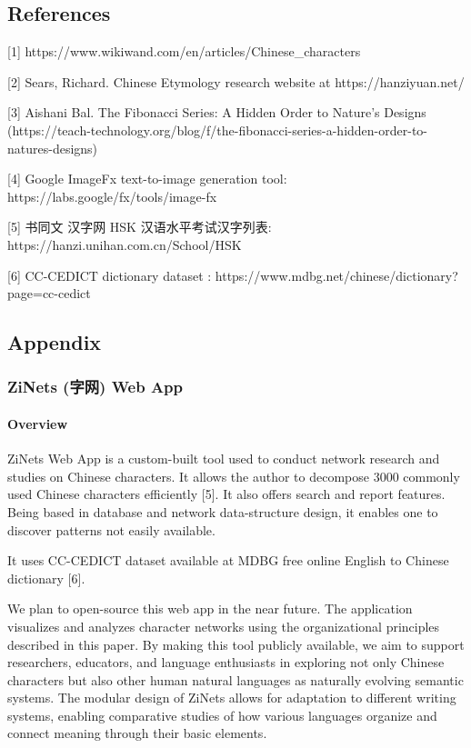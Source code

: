 \documentclass[
  11pt,
  letterpaper,
]{article}
\begin{document}
\hypertarget{references}{%
\subsection{References}\label{references}}

{[}1{]} https://www.wikiwand.com/en/articles/Chinese\_characters

{[}2{]} Sears, Richard. Chinese Etymology research website at
https://hanziyuan.net/

{[}3{]} Aishani Bal. The Fibonacci Series: A Hidden Order to Nature's
Designs
(https://teach-technology.org/blog/f/the-fibonacci-series-a-hidden-order-to-natures-designs)

{[}4{]} Google ImageFx text-to-image generation tool:
https://labs.google/fx/tools/image-fx

{[}5{]} 书同文 汉字网 HSK 汉语水平考试汉字列表:
https://hanzi.unihan.com.cn/School/HSK

{[}6{]} CC-CEDICT dictionary dataset :
https://www.mdbg.net/chinese/dictionary?page=cc-cedict

\hypertarget{appendix}{%
\subsection{Appendix}\label{appendix}}

\hypertarget{zinets-ux5b57ux7f51-web-app}{%
\subsubsection{ZiNets (字网) Web
App}\label{zinets-ux5b57ux7f51-web-app}}

\hypertarget{overview}{%
\paragraph{Overview}\label{overview}}

ZiNets Web App is a custom-built tool used to conduct network research
and studies on Chinese characters. It allows the author to decompose
3000 commonly used Chinese characters efficiently {[}5{]}. It also
offers search and report features. Being based in database and network
data-structure design, it enables one to discover patterns not easily
available.

It uses CC-CEDICT dataset available at MDBG free online English to
Chinese dictionary {[}6{]}.

We plan to open-source this web app in the near future. The application
visualizes and analyzes character networks using the organizational
principles described in this paper. By making this tool publicly
available, we aim to support researchers, educators, and language
enthusiasts in exploring not only Chinese characters but also other
human natural languages as naturally evolving semantic systems. The
modular design of ZiNets allows for adaptation to different writing
systems, enabling comparative studies of how various languages organize
and connect meaning through their basic elements.
\end{document}
